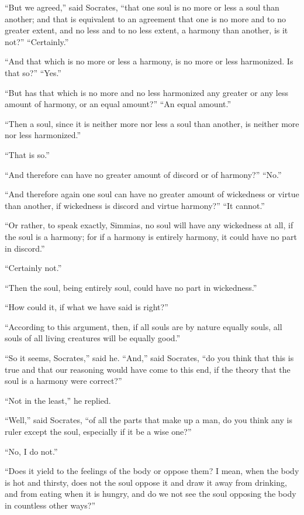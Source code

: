 \documentclass[letterpaper,12pt]{article}
\newcommand{\stephpag}[1]{\marginnote{\small\itshape\fontfamily{ppl}\selectfont #1}}
\begin{document}
\begin{drama}
``But we agreed,'' said Socrates, \stephpag{d} ``that one soul is no more or less a soul than another; and that is equivalent to an agreement that one is no more and to no greater extent, and no less and to no less extent, a harmony than another, is it not?'' ``Certainly.''
 
``And that which is no more or less a harmony, is no more or less harmonized. Is that so?'' ``Yes.''
 
``But has that which is no more and no less harmonized any greater or any less amount of harmony, or an equal amount?'' ``An equal amount.''
 
``Then a soul, since it is neither more nor less \stephpag{e} a soul than another, is neither more nor less harmonized.''
 
``That is so.''
 
``And therefore can have no greater amount of discord or of harmony?'' ``No.''
 
``And therefore again one soul can have no greater amount of wickedness or virtue than another, if wickedness is discord and virtue harmony?'' ``It cannot.''
 
``Or rather, to speak exactly, Simmias, \stephpag{94 a} no soul will have any wickedness at all, if the soul is a harmony; for if a harmony is entirely harmony, it could have no part in discord.''
 
``Certainly not.''
 
``Then the soul, being entirely soul, could have no part in wickedness.''
 
``How could it, if what we have said is right?''
 
``According to this argument, then, if all souls are by nature equally souls, all souls of all living creatures will be equally good.''
 
``So it seems, Socrates,'' said he. \stephpag{b} ``And,'' said Socrates, ``do you think that this is true and that our reasoning would have come to this end, if the theory that the soul is a harmony were correct?''
 
``Not in the least,'' he replied.
 
``Well,'' said Socrates, ``of all the parts that make up a man, do you think any is ruler except the soul, especially if it be a wise one?''
 
``No, I do not.''
 
``Does it yield to the feelings of the body or oppose them? I mean, when the body is hot and thirsty, does not the soul oppose it and draw it away from drinking, and from eating when it is hungry, and do we not see the soul opposing the body \stephpag{c} in countless other ways?''
 

\end{drama}
\end{document}
